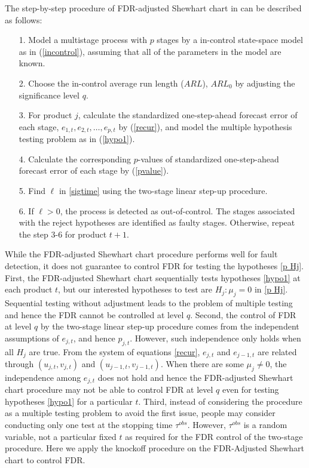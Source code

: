 \documentclass[a4paper,12pt]{article}
\providecommand{\tightlist}{%
  \setlength{\itemsep}{0pt}\setlength{\parskip}{0pt}}
\begin{document}
The step-by-step procedure of FDR-adjusted Shewhart chart in \cite{li2009false} can be described as follows:
\begin{itemize}
\tightlist
\item[1.] 
Model a multistage process with $p$ stages by a in-control state-space model as in (\ref{incontrol}), assuming that all of the parameters in the model are known.
\item[2.]
Choose the in-control average run length ($ARL$), $ARL_0$ by adjusting the significance level $q$.
\item[3.]
For product $j$, calculate the standardized one-step-ahead forecast error of each stage, $e_{1,t}, e_{2,t}, \ldots , e_{p,t}$ by (\ref{recur}), and model the multiple hypothesis testing problem as in (\ref{hypo1}).
\item[4.]
Calculate the corresponding $p$-values of standardized one-step-ahead forecast error of each stage by (\ref{pvalue}).
\item[5.]
Find $\ell$ in \eqref{sigtime} using the two-stage linear step-up procedure.
\item[6.]
If $\ell > 0$, the process is detected as out-of-control. The stages associated with the reject hypotheses are identified as faulty stages. Otherwise, repeat the step 3-6 for product $t+1$.
\end{itemize}
While the FDR-adjusted Shewhart chart procedure performs well for fault detection, it does not guarantee to control FDR for testing the hypotheses \eqref{p Hj}. First, the FDR-adjusted Shewhart chart sequentially tests hypotheses \eqref{hypo1} at each product $t$, but our interested hypotheses to test are $H_j:\mu_j=0$ in \eqref{p Hj}. Sequential testing without adjustment leads to the problem of multiple testing and hence the FDR cannot be controlled at level $q$. Second, the control of FDR at level $q$ by the two-stage linear step-up procedure comes from the independent assumptions of $e_{j,t}$, and hence $p_{j,t}$. However, such independence only holds when all $H_j$ are true. From the system of equations \eqref{recur}, $e_{j,t}$ and $e_{j-1,t}$ are related through $(u_{j,t},v_{j,t})$ and $(u_{j-1,t},v_{j-1,t})$. When there are some $\mu_j\neq 0$, the independence among $e_{j,t}$ does not hold and hence the FDR-adjusted Shewhart chart procedure may not be able to control FDR at level $q$ even for testing hypotheses \eqref{hypo1} for a particular $t$. Third, instead of considering the procedure as a multiple testing problem to avoid the first issue, people may consider conducting only one test at the stopping time $\tau^{obs}$. However, $\tau^{obs}$ is a random variable, not a particular fixed $t$ as required for the FDR control of the two-stage procedure. Here we apply the knockoff procedure on the FDR-Adjusted Shewhart chart to control FDR. 
\end{document}
